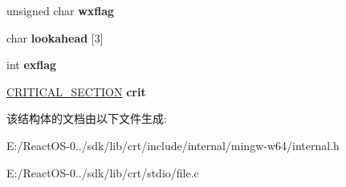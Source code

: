 \begin{DoxyCompactItemize}
unsigned char {\bfseries wxflag}
\item 
\mbox{\label{structioinfo_af2927d9554e5800aa5fbe9d10a5edb22}} 
char {\bfseries lookahead} \mbox{[}3\mbox{]}
\item 
\mbox{\label{structioinfo_a67ec87c9079688586e3b9257e09e85b7}} 
int {\bfseries exflag}
\item 
\mbox{\label{structioinfo_afa549c6f337c7201586d7fe20e54cfd5}} 
\hyperlink{struct___c_r_i_t_i_c_a_l___s_e_c_t_i_o_n}{C\+R\+I\+T\+I\+C\+A\+L\+\_\+\+S\+E\+C\+T\+I\+ON} {\bfseries crit}
\end{DoxyCompactItemize}


该结构体的文档由以下文件生成\+:\begin{DoxyCompactItemize}
\item 
E\+:/\+React\+O\+S-\/0../sdk/lib/crt/include/internal/mingw-\/w64/internal.\+h\item 
E\+:/\+React\+O\+S-\/0../sdk/lib/crt/stdio/file.\+c\end{DoxyCompactItemize}
